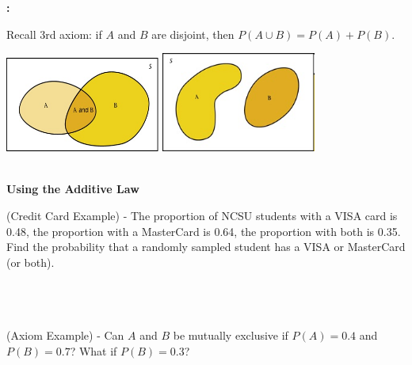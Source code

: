 \newpage

\textbf{\underbar{~~~~~~~~~~~~~~~~~~~~~~~~~~~~~~~~~~~~~~~~~~~~~~~~~~~~~~~~~~~~~~~~~~~~~~~}:}\\
\begin{center}
\end{center}
Recall 3rd axiom: if $A$ and $B$ are disjoint, then $P(A \cup B) = P(A) + P(B)$.\\
\begin{center}
\includegraphics[angle=0,width=2in,totalheight=1in]{chapter4/AandB.jpg}
\includegraphics[angle=0,width=2in,totalheight=1in]{chapter4/AandB2.jpg}
\end{center}
~\\

\textbf{Using the Additive Law}
\bi
\item (Credit Card Example) - The proportion of NCSU students with a VISA card is 0.48, the proportion with a MasterCard is 0.64, the proportion with both is 0.35.  \\
Find the probability that a randomly sampled student has a VISA or MasterCard (or both).\\~\\~\\~\\
\item (Axiom Example) - Can $A$ and $B$ be mutually exclusive if $P(A)=0.4$ and $P(B)=0.7$? What if $P(B)=0.3$?\\~\\~\\~\\~\\
\ei

